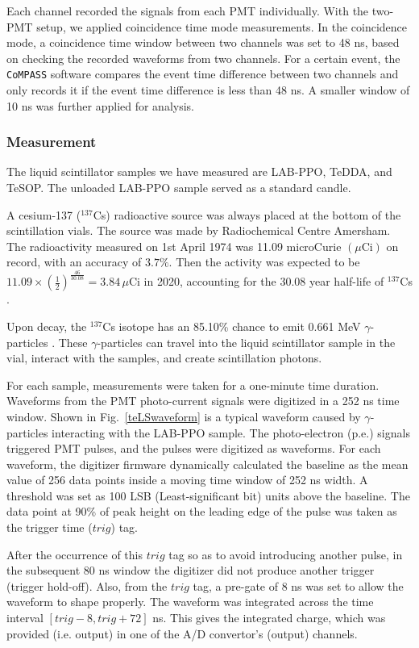 Each channel recorded the signals from each PMT individually. With the two-PMT setup, we applied coincidence time mode measurements. In the coincidence mode, a coincidence time window between two channels was set to 48 ns, based on checking the recorded waveforms from two channels. For a certain event, the \texttt{CoMPASS} software compares the event time difference between two channels and only records it if the event time difference is less than 48 ns. A smaller window of 10 ns was further applied for analysis.

\subsubsection{Measurement}

The liquid scintillator samples we have measured are LAB-PPO, TeDDA, and TeSOP. The unloaded LAB-PPO sample served as a standard candle.

A cesium-137 ($^{137}$Cs) radioactive source was always placed at the bottom of the scintillation vials.
The source was made by Radiochemical Centre Amersham. The radioactivity measured on 1st April 1974 was 11.09 microCurie $(\mu\mathrm{Ci})$ on record, with an accuracy of $3.7\%$. Then the activity was expected to be 
$11.09\times ({\frac{1}{2}})^{\frac{46}{30.08}}=3.84 \, \mu\mathrm{Ci}$ in 2020, accounting for the 30.08 year half-life of $^{137}$Cs \cite{nndc}.

Upon decay, the $^{137}$Cs isotope has an 85.10\% chance to emit 0.661 MeV $\gamma$-particles \cite{nndc}. These $\gamma$-particles can travel into the liquid scintillator sample in the vial, interact with the samples, and create scintillation photons.

For each sample, measurements were taken for a one-minute time duration. Waveforms from the PMT photo-current signals were digitized in a 252 ns time window. Shown in Fig.~\ref{teLSwaveform} is a typical waveform caused by $\gamma$-particles interacting with the LAB-PPO sample. The photo-electron (p.e.) signals triggered PMT pulses, and the pulses were digitized as waveforms. For each waveform, the digitizer firmware dynamically calculated the baseline as the mean value of 256 data points inside a moving time window of 252 ns width. A threshold was set as 100 LSB (Least-significant bit) units above the baseline. The data point at 90\% of peak height on the leading edge of the pulse was taken as the trigger time ($trig$) tag.

After the occurrence of this $trig$ tag so as to avoid introducing another pulse, in the subsequent 80 ns window the digitizer did not produce another trigger (trigger hold-off). Also, from the $trig$ tag, a pre-gate of 8 ns was set to allow the waveform to shape properly. The waveform was integrated across the time interval $[trig-8, trig+72]$ ns. This gives the integrated charge, which was provided (i.e. output) in one of the A/D convertor's (output) channels. 

